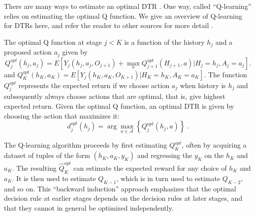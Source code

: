 There are many ways to estimate an optimal DTR . One way, called ``Q-learning'' relies on estimating the optimal Q function. We give an overview of Q-learning for DTRs here, and refer the reader to other sources for more detail \cite{chakraborty2013statistical}.

The optimal Q function at stage $j < K$ is a function of the history $ h_j $ and a proposed action $ a_j $ given by
\begin{equation}\label{eq:Qfunction}
 Q_j^{opt}(h_j, a_j) = E \left[ Y_j(h_j, a_j, O_{j+1}) + \max_a Q_{j+1}^{opt}(H_{j+1}, a) | H_j = h_j, A_j = a_j
 \right].
\end{equation}
and $Q_K^{opt}(h_K, a_K) = E[ Y_j(h_K, a_K, O_{K+1}) | H_K = h_K, A_K = a_K]$. The function $Q_j^{opt}$ represents the expected return if we choose action $a_j$ when history is $h_j$ and subsequently always choose actions that are optimal, that is, give highest expected return. Given the optimal Q function, an optimal DTR is given by choosing the action that maximizes it:
\begin{equation}
d_j^{opt}(h_j) = \arg\max_{a\in \mathcal{A}} \left\{Q_j^{opt}(h_j,a)\right\} \>.
\end{equation}

The Q-learning algorithm proceeds by first estimating $Q_K^{opt}$, often by acquiring a dataset of tuples of the form $(h_K, a_K, y_K)$ and regressing the $y_K$ on the $h_K$ and $a_K$. The resulting $\hat{Q}_K^{opt}$ can estimate the expected reward for any choice of $h_K$ and $a_K$. It is then used to estimate $Q_{K-1}$, which is in turn used to estimate $Q_{K-2}$, and so on. This ``backward induction'' approach emphasizes that the optimal decision rule at earlier stages depends on the decision rules at later stages, and that they cannot in general be optimized independently.



